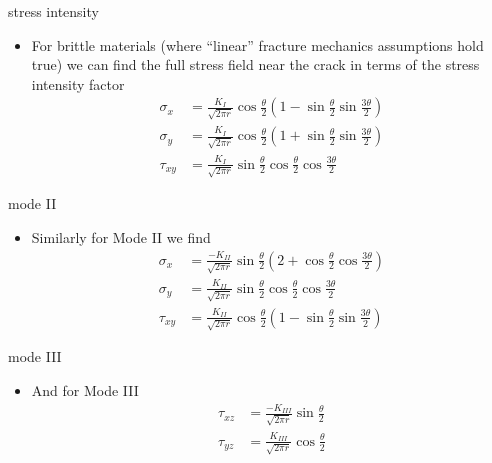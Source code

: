 \documentclass[
  letterpaper,
  ignorenonframetext,
  aspectratio=43,
  handout,
  12pt]{beamer}
\providecommand{\tightlist}{%
  \setlength{\itemsep}{0pt}\setlength{\parskip}{0pt}}
\providecommand{\tightlist}{%
\setlength{\itemsep}{0pt}\setlength{\parskip}{0pt}}
\begin{document}
\begin{frame}{stress intensity}
\protect\hypertarget{stress-intensity-2}{}
\begin{itemize}
\tightlist
\item
  For brittle materials (where ``linear'' fracture mechanics assumptions
  hold true) we can find the full stress field near the crack in terms
  of the stress intensity factor \[ \begin{aligned}
   \sigma_x &= \frac{K_I}{\sqrt{2\pi r}} \cos \frac{\theta}{2} \left(1-\sin \frac{\theta}{2}\sin \frac{3\theta}{2}\right)\\
   \sigma_y &= \frac{K_I}{\sqrt{2\pi r}} \cos \frac{\theta}{2} \left(1+\sin \frac{\theta}{2}\sin \frac{3\theta}{2}\right)\\
   \tau_{xy} &= \frac{K_I}{\sqrt{2\pi r}} \sin \frac{\theta}{2} \cos \frac{\theta}{2}\cos \frac{3\theta}{2}
  \end{aligned} \]
\end{itemize}
\end{frame}

\begin{frame}{mode II}
\protect\hypertarget{mode-ii}{}
\begin{itemize}
\tightlist
\item
  Similarly for Mode II we find \[ \begin{aligned}
   \sigma_x &= \frac{-K_{II}}{\sqrt{2\pi r}} \sin \frac{\theta}{2} \left(2+\cos \frac{\theta}{2}\cos \frac{3\theta}{2}\right)\\
   \sigma_y &= \frac{K_{II}}{\sqrt{2\pi r}} \sin \frac{\theta}{2} \cos \frac{\theta}{2}\cos \frac{3\theta}{2}\\
   \tau_{xy} &= \frac{K_{II}}{\sqrt{2\pi r}} \cos \frac{\theta}{2} \left(1-\sin \frac{\theta}{2}\sin \frac{3\theta}{2}\right)
  \end{aligned} \]
\end{itemize}
\end{frame}

\begin{frame}{mode III}
\protect\hypertarget{mode-iii}{}
\begin{itemize}
\tightlist
\item
  And for Mode III \[ \begin{aligned}
   \tau_{xz} &= \frac{-K_{III}}{\sqrt{2\pi r}} \sin \frac{\theta}{2} \\
   \tau_{yz} &= \frac{K_{III}}{\sqrt{2\pi r}} \cos \frac{\theta}{2}
  \end{aligned} \]
\end{itemize}
\end{frame}
\end{document}
